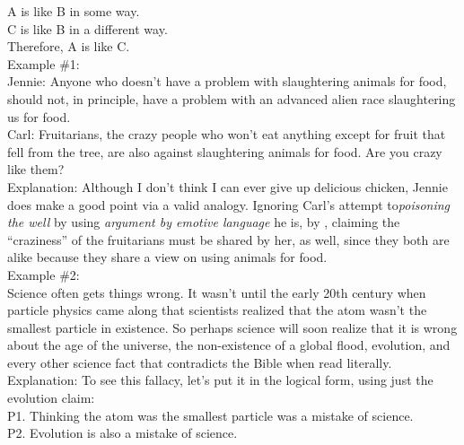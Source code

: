 \documentclass[a4paper,12pt,single,pdftex]{scrbook}
\begin{document}
    
      A is like B in some way.
    \\

    
      C is like B in a different way.
    \\

    
      Therefore, A is like C.
    \\

    
      Example \#1:
    \\

    
      Jennie: Anyone who doesn’t have a problem with slaughtering animals for food, should not, in principle, have a problem with an advanced alien race slaughtering us for food.
    \\

    
      Carl: Fruitarians, the crazy people who won’t eat anything except for fruit that fell from the tree, are also against slaughtering animals for food.  Are you crazy like them?
    \\

    
      Explanation: Although I don’t think I can ever give up delicious chicken, Jennie does make a good point via a valid analogy.  Ignoring Carl’s attempt to{\it  poisoning the well }by using {\it argument by emotive language} he is, by{\it  
}, claiming the “craziness” of the fruitarians must be shared by her, as well, since they both are alike because they share a view on using animals for food.
    \\

    
      Example \#2:
    \\

    
      Science often gets things wrong.  It wasn’t until the early 20th century when particle physics came along that scientists realized that the atom wasn’t the smallest particle in existence.  So perhaps science will soon realize that it is wrong about the age of the universe, the non-existence of a global flood, evolution, and every other science fact that contradicts the Bible when read literally.
    \\

    
      Explanation: To see this fallacy, let’s put it in the logical form, using just the evolution claim:
    \\

    
      P1. Thinking the atom was the smallest particle was a mistake of science.
    \\

    
      P2. Evolution is also a mistake of science.
    \\
\end{document}
